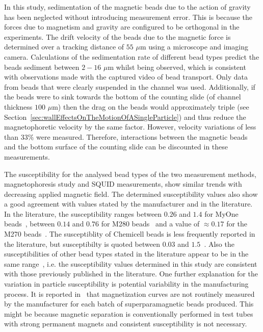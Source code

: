 In this study, sedimentation of the magnetic beads due to the action of gravity has been neglected without introducing measurement error. This is because the forces due to magnetism and gravity are configured to be orthogonal in the experiments. The drift velocity of the beads due to the magnetic force is determined over a tracking distance of $55$ $\mu$m using a microscope and imaging camera. Calculations of the sedimentation rate of different bead types predict the beads sediment between $2-16$ $\mu$m whilst being observed, which is consistent with observations made with the captured video of bead transport. Only data from beads that were clearly suspended in the channel was used. Additionally, if the beads were to sink towards the bottom of the counting slide (of channel thickness $100$ $\mu$m) then the drag on the beads would approximately triple (see Section~\ref{sec:wallEffectsOnTheMotionOfASingleParticle}) and thus reduce the magnetophoretic velocity by the same factor. However, velocity variations of less than $33\%$ were measured. Therefore, interactions between the magnetic beads and the bottom surface of the counting slide can be discounted in these measurements.

The susceptibility for the analysed bead types of the two measurement methods, magnetophoresis study and SQUID measurements, show similar trends with decreasing applied magnetic field. The determined susceptibility values also show a good agreement with values stated by the manufacturer and in the literature. In the literature, the susceptibility ranges between $0.26$ and $1.4$ for MyOne beads~\cite{Fonnum2005,Tarn2009a}, between $0.14$ and $0.76$ for M280 beads~\cite{Fonnum2005,Sinha2012,Lee2007a} and a value of $\approx0.17$ for the M270 beads~\cite{Tarn2009a,Li2013}. The susceptiblity of Chemicell beads is less frequently reported in the literature, but susceptibilty is quoted between $0.03$ and $1.5$~\cite{Haefeli2005,Adolphi2010,Wise2015,Oduwole2016}. Also the susceptibilities of other bead types stated in the literature appear to be in the same range~\cite{Shevkoplyas2007,Sinha2009,Tsai2011}, i.e. the susceptibility values determined in this study are consistent with those previously published in the literature. One further explanation for the variation in particle susceptibility is potential variability in the manufacturing process. It is reported in~\cite{Shevkoplyas2007} that magnetization curves are not routinely measured by the manufacturer for each batch of superparamagnetic beads produced. This might be because magnetic separation is conventionally performed in test tubes with strong permanent magnets and consistent susceptibility is not necessary.

